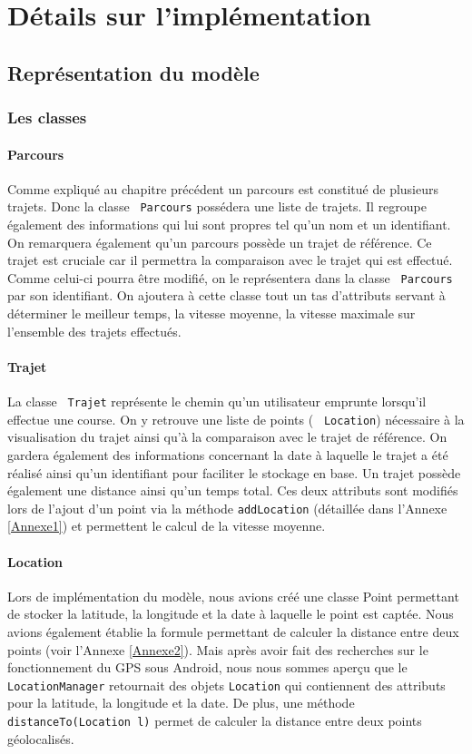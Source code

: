 \chapter{Détails sur l'implémentation}
\section{Représentation du modèle}

\subsection{Les classes}
\subsubsection{Parcours}
Comme expliqué au chapitre précédent un parcours est constitué de plusieurs trajets. Donc la classe  \verb! Parcours! possédera une liste de trajets. Il regroupe également des informations qui lui sont propres tel qu'un nom et un identifiant. On remarquera également qu'un parcours possède un trajet de référence. Ce trajet est cruciale car il permettra la comparaison avec le trajet qui est effectué. Comme celui-ci pourra être modifié, on le représentera dans la classe  \verb! Parcours! par son identifiant. On ajoutera à cette classe tout un tas d'attributs servant à déterminer le meilleur temps, la vitesse moyenne, la vitesse maximale sur l'ensemble des trajets effectués.

\subsubsection{Trajet}
La classe  \verb! Trajet! représente le chemin qu'un utilisateur emprunte lorsqu'il effectue une course. On y retrouve une liste de points ( \verb! Location!) nécessaire à la visualisation du trajet ainsi qu'à la comparaison avec le trajet de référence. On gardera également des informations concernant la date à laquelle le trajet a été réalisé ainsi qu'un identifiant pour faciliter le stockage en base. Un trajet possède également une distance ainsi qu'un temps total. Ces deux attributs sont modifiés lors de l'ajout d'un point via la méthode \verb!addLocation! (détaillée dans l'Annexe \ref{Annexe1}) et permettent le calcul de la vitesse moyenne.

\subsubsection{Location}
Lors de implémentation du modèle, nous avions créé une classe Point permettant de stocker la latitude, la longitude et la date à laquelle le point est captée. Nous avions également établie la formule permettant de calculer la distance entre deux points (voir l'Annexe \ref{Annexe2}). Mais après avoir fait des recherches sur le fonctionnement du GPS sous Android, nous nous sommes aperçu que le \verb!LocationManager! retournait des objets \verb!Location! qui contiennent des attributs pour la latitude, la longitude et la date. De plus, une méthode \verb!distanceTo(Location l)! permet de calculer la distance entre deux points géolocalisés. 

